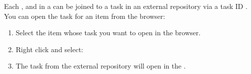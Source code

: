 
Each \gdcase{}, \gdsuite{} and \gdjob{}  in a \gdproject{} can be joined to a task in an external repository via a task ID . You can open the task for an item from the browser:

\begin{enumerate}
\item Select the item whose task you want to open in the browser.
\item Right click and select:\\
\item The task from the external repository will open in the \ite{}.
\end{enumerate}
